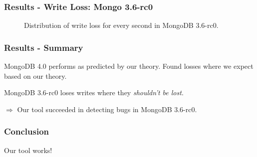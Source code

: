 \documentclass[numfooter,sectionpages,protectFrameTitle, progressbar, cblock, valigncolumns, addlogo]{beamer}
\begin{document}
\begin{frame}
    \frametitle{Results - Write Loss: Mongo 3.6-rc0}
    
    \begin{figure}
        \scalebox{.5}{}
        \caption{Distribution of write loss for every second in MongoDB 3.6-rc0.}
    \end{figure}
\end{frame}




\begin{frame}
    \frametitle{Results - Summary}

    MongoDB 4.0 performs as predicted by our theory. Found losses where we expect based on our theory.

    MongoDB 3.6-rc0 loses writes where they \textit{shouldn't be lost}.

    $\Rightarrow$ Our tool succeeded in detecting bugs in MongoDB 3.6-rc0.
\end{frame}

\begin{frame}
    \frametitle{Conclusion}

    \centering
    Our tool works!
\end{frame}






\end{document}
